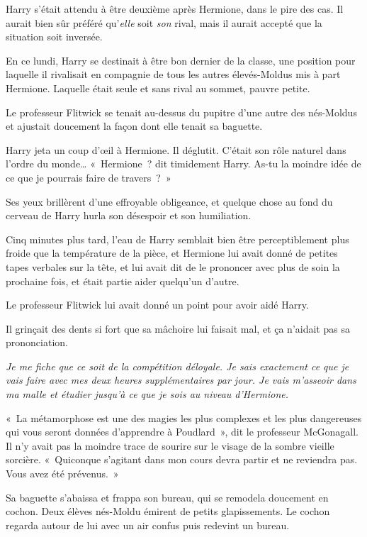 Harry s'était attendu à être deuxième après Hermione, dans le pire des cas. Il aurait bien sûr préféré qu'\emph{elle} soit \emph{son} rival, mais il aurait accepté que la situation soit inversée.

En ce lundi, Harry se destinait à être bon dernier de la classe, une position pour laquelle il rivalisait en compagnie de tous les autres élevés-Moldus mis à part Hermione. Laquelle était seule et sans rival au sommet, pauvre petite.

Le professeur Flitwick se tenait au-dessus du pupitre d'une autre des nés-Moldus et ajustait doucement la façon dont elle tenait sa baguette.

Harry jeta un coup d'œil à Hermione. Il déglutit. C'était son rôle naturel dans l'ordre du monde… «~Hermione~? dit timidement Harry. As-tu la moindre idée de ce que je pourrais faire de travers~?~»

Ses yeux brillèrent d'une effroyable obligeance, et quelque chose au fond du cerveau de Harry hurla son désespoir et son humiliation.

Cinq minutes plus tard, l'eau de Harry semblait bien être perceptiblement plus froide que la température de la pièce, et Hermione lui avait donné de petites tapes verbales sur la tête, et lui avait dit de le prononcer avec plus de soin la prochaine fois, et était partie aider quelqu'un d'autre.

Le professeur Flitwick lui avait donné un point pour avoir aidé Harry.

Il grinçait des dents si fort que sa mâchoire lui faisait mal, et ça n'aidait pas sa prononciation.

\emph{Je me fiche que ce soit de la compétition déloyale. Je sais exactement ce que je vais faire avec mes deux heures supplémentaires par jour. Je vais m'asseoir dans ma malle et étudier jusqu'à ce que je sois au niveau d'Hermione.}

\later

«~La métamorphose est une des magies les plus complexes et les plus dangereuses qui vous seront données d'apprendre à Poudlard~», dit le professeur McGonagall. Il n'y avait pas la moindre trace de sourire sur le visage de la sombre vieille sorcière. «~Quiconque s'agitant dans mon cours devra partir et ne reviendra pas. Vous avez été prévenus.~»

Sa baguette s'abaissa et frappa son bureau, qui se remodela doucement en cochon. Deux élèves nés-Moldu émirent de petits glapissements. Le cochon regarda autour de lui avec un air confus puis redevint un bureau.

